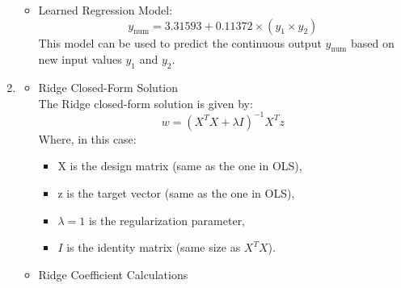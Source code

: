 \documentclass[12pt]{article}
\begin{document}
\begin{enumerate}[leftmargin=\labelsep, label=\textbf{\arabic*.)}]
\begin{itemize}
\begin{minipage}{1\textwidth}
                    \end{minipage}
                    \vspace{0.5em}
              \item Learned Regression Model:
                    \[
                        y_{\text{num}} = 3.31593 + 0.11372 \times (y_1 \times y_2)
                    \]
                    This model can be used to predict the continuous output \( y_{\text{num}} \) based on new input values \( y_1 \) and \( y_2 \).
          \end{itemize}
          \vspace{0.5em}
    \item \begin{itemize}
              \item Ridge Closed-Form Solution \\
                    \vspace{0.5em}
                    The Ridge closed-form solution is given by:
                    \[
                        w = ({X}^T {X} + \lambda I)^{-1} {X}^T z
                    \]
                    Where, in this case:
                    \begin{itemize}
                        \item X is the design matrix (same as the one in OLS),
                        \item z is the target vector (same as the one in OLS),
                        \item \( \lambda = 1 \) is the regularization parameter,
                        \item \( I \) is the identity matrix (same size as ${X}^T{X}$).
                    \end{itemize}
                    \vspace{0.5em}
              \item Ridge Coefficient Calculations \\
                    \vspace{0.5em}
                    \begin{minipage}{1\textwidth}
                        \[
\]
\end{minipage}
\end{itemize}
\end{enumerate}
\end{document}
